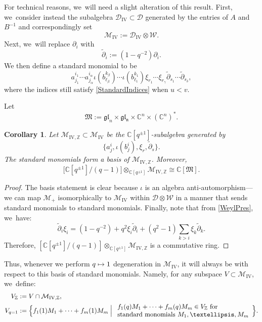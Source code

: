 \documentclass[11pt]{article}
\newcommand\mto{\mathchoice{\longmapsto}{\mapsto}{\mapsto}{\mapsto}}
\newtheorem{cor}[thm]{Corollary}
\theoremstyle{definition}
\newcommand{\ZZ}{\mathbb{Z}}
\newcommand{\CC}{\mathbb{C}}
\newcommand{\DD}{\mathcal{D}}
\newcommand{\WW}{\mathcal{W}}
\newcommand{\MM}{\mathcal{M}}
\newcommand{\del}{\partial}
\begin{document}
For technical reasons, we~will need a slight alteration of this result.
First, we~consider instead the subalgebra $\DD_{\mathrm{IV}}\subset\DD$ generated by the entries of $A$ and $B^{-1}$ and correspondingly set
\[
\MM_{\mathrm{IV}}:=\DD_{\mathrm{IV}}\otimes\WW.
\]
Next, we~will replace $\partial_i$ with
\[
\widetilde{\partial}_i:=(1-q^{-2})\partial_i.
\]
We then define a standard monomial to be
\[
a^{i_1}_{j_1}\cdots a^{i_{\alpha}}_{j_{\alpha}}
\iota(b^{k_{\beta}}_{\ell_{\beta}})\cdots \iota(b^{k_1}_{\ell_1})
\xi_{r_1}\cdots \xi_{r_\gamma}
\widetilde{\del}_{s_1}\cdots\widetilde{\del}_{s_\delta},
\]
where the indices still satisfy \eqref{StandardIndices} when $u<v$.

Let
\[
\mathfrak{M}:=\mathfrak{gl}_n\times\mathfrak{gl_n}\times\CC^n\times\left(\CC^n\right)^*.
\]

\begin{cor}\label{StandardCor}
Let $\MM_{\mathrm{IV},\ZZ}\subset\MM_{\mathrm{IV}}$ be the $\CC[q^{\pm 1}]$-subalgebra generated by
\[
\bigl\{a^i_j, \iota(b^i_j), \xi_r, \widetilde{\del}_s \bigr\}.
\]
The standard monomials form a basis of $\MM_{\mathrm{IV,\ZZ}}$.
Moreover,
\[
\bigl[ \CC[q^{\pm 1}]\big/ (q-1) \bigr]\otimes_{\CC[q^{\pm 1}]}\MM_{\mathrm{IV},\ZZ}\cong \CC[\mathfrak{M}].
\]
\end{cor}

\begin{proof}
The basis statement is clear because $\iota$ is an algebra anti-automorphism---we can map $\MM_+$ isomorphically to $\MM_{\mathrm{IV}}$ within $\DD\otimes\WW$ in a manner that sends standard monomials to standard monomials.
Finally, note that from \eqref{WeylPres}, we~have:
\[
\widetilde{\partial}_i\xi_i= (1-q^{-2})+q^2\xi_i\widetilde{\partial}_i+(q^2-1)\sum_{k>i}\xi_k\widetilde{\partial}_k.
\]
Therefore, $\left[ \CC[q^{\pm 1}]\big/(q-1) \right]\otimes_{\CC[q^{\pm 1}]}\MM_{\mathrm{IV},\ZZ}$ is a commutative ring.
\end{proof}

Thus, whenever we perform $q\mto 1$ degeneration in $\mathcal{M}_{\mathrm{IV}}$, it will always be with respect to this basis of standard monomials.
Namely, for any subspace $V\subset\MM_{\mathrm{IV}}$, we~define:
\begin{align}
V_\ZZ&:= V\cap \MM_{\mathrm{IV},\ZZ},\\
V_{q=1}&:=\Bigl\{f_1(1)M_1+\cdots +f_m(1)M_m\Bigm|
\begin{array}{l}
f_1(q)M_1+\cdots+f_m(q)M_m\in V_\ZZ\hbox{ for}\\
\hbox{standard monomials }M_1,\ldots ,M_m
\end{array}
\Bigr\}.
\label{DegenDef}
\end{align}
\end{document}
